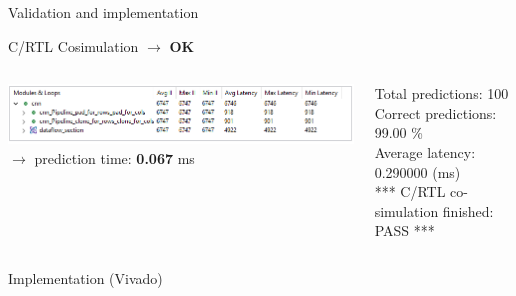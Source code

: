\documentclass[10pt, xcolor=dvipsnames, compress]{beamer}
\begin{document}
\begin{frame}{Validation and implementation}

    \hspace*{-2.2em} C/RTL Cosimulation $\rightarrow$ \textbf{OK}

    \vspace*{.5em}
    \begin{columns}[T]
        \begin{column}{.6\textwidth}
            \includegraphics[width=\textwidth]{synthesis-result/co_simulation.png}\\
            $\rightarrow$ prediction time: \textbf{0.067} ms
        \end{column}

        \begin{column}{.4\textwidth}


        {
            \ttfamily
            \tiny
            \linespread{1}
            Total predictions: 100\\
            Correct predictions: 99.00 \%\\
            Average latency: 0.290000 (ms)\\
            *** C/RTL co-simulation finished: PASS ***\\


        }

        \end{column}

    \end{columns}


    \vspace*{1em}

    \hspace*{-2.2em} Implementation (Vivado)

    \vspace*{.5em}



\end{frame}
\end{document}
